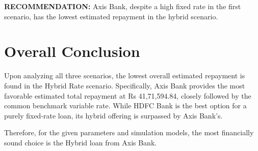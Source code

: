 \documentclass{article}
\begin{document}
\textbf{RECOMMENDATION:} Axis Bank, despite a high fixed rate in the first scenario, has the lowest estimated repayment in the hybrid scenario.

\section{Overall Conclusion}
Upon analyzing all three scenarios, the lowest overall estimated repayment is found in the Hybrid Rate scenario. Specifically, Axis Bank provides the most favorable estimated total repayment at Rs 41,71,594.84, closely followed by the common benchmark variable rate. While HDFC Bank is the best option for a purely fixed-rate loan, its hybrid offering is surpassed by Axis Bank's.

Therefore, for the given parameters and simulation models, the most financially sound choice is the Hybrid loan from Axis Bank.
\end{document}
